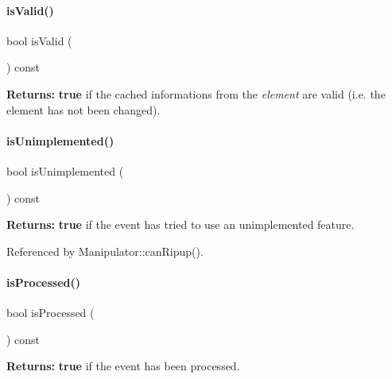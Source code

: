 \paragraph{\texorpdfstring{is\+Valid()}{isValid()}}
{\footnotesize\ttfamily bool is\+Valid (\begin{DoxyParamCaption}{ }\end{DoxyParamCaption}) const\hspace{0.3cm}{\ttfamily [inline]}}

{\bfseries Returns\+:} {\bfseries true} if the cached informations from the {\itshape element} are valid (i.\+e. the element has not been changed). \mbox{\label{classKite_1_1RoutingEvent_af8b3ab994396ccd821f529c5c02760a5}} 
\paragraph{\texorpdfstring{is\+Unimplemented()}{isUnimplemented()}}
{\footnotesize\ttfamily bool is\+Unimplemented (\begin{DoxyParamCaption}{ }\end{DoxyParamCaption}) const}

{\bfseries Returns\+:} {\bfseries true} if the event has tried to use an unimplemented feature. 

Referenced by Manipulator\+::can\+Ripup().

\mbox{\label{classKite_1_1RoutingEvent_a83943e04f0ee0a5a38208278b97fc780}} 
\paragraph{\texorpdfstring{is\+Processed()}{isProcessed()}}
{\footnotesize\ttfamily bool is\+Processed (\begin{DoxyParamCaption}{ }\end{DoxyParamCaption}) const\hspace{0.3cm}{\ttfamily [inline]}}

{\bfseries Returns\+:} {\bfseries true} if the event has been processed. \mbox{\label{classKite_1_1RoutingEvent_a50607443b762961229119228be30c5ad}} 
